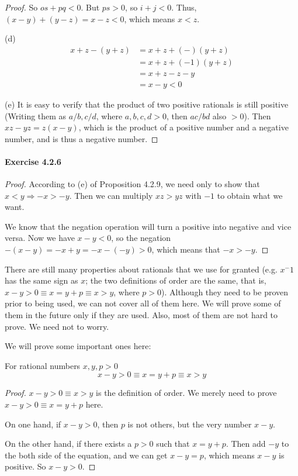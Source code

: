 \begin{proof}
So $os+pq<0$. But $ps>0$, so $i+j<0$. Thus, $(x-y) + (y-z) = x-z<0$, which means $x<z$.

(d)
\begin{align*}
x+z-(y+z) 
&= x+z + (-)(y+z) \\
&= x+z + (-1)(y+z) \\
&= x+z -z - y \\
&= x-y <0
\end{align*}

(e)
It is easy to verify that the product of two positive rationals is still positive (Writing them as 
$a/b,c/d$, where $a,b,c,d>0$, then $ac/bd$ also $>0$). Then $xz-yz=z(x-y)$, which is the product of a 
positive number and a negative number, and is thus a negative number.
\end{proof}

\paragraph{Exercise 4.2.6} \label{exercise4.2.6}
\begin{proof}
According to (e) of Proposition 4.2.9, we need only to show that $x<y \Longrightarrow -x>-y$. Then we can 
multiply $xz>yz$ with $-1$ to obtain what we want.

We know that the negation operation will turn a positive into negative and vice versa. Now we have 
$x-y<0$, so the negation $-(x-y) = -x+y = -x - (-y)>0$, which means that $-x>-y$.
\end{proof}

There are still many properties about rationals that we use for granted (e.g. $x^-1$ has the same sign as 
$x$; the two definitions of order are the same, that is, $x-y>0 \equiv x=y+p \equiv x>y$, where $p>0$). 
Although they need to be proven prior to being used, we can not cover all of them here. We will 
prove some of them in the future only if they are used. Also, most of them are not hard to prove. We need 
not to worry.

We will prove some important ones here:
\begin{prop} \label{prop.different.def.of.order}
For rational numbers $x,y,p>0$
\[
x-y>0 \equiv x=y+p \equiv x>y
\]
\end{prop}
\begin{proof}
$x-y>0 \equiv x>y$ is the definition of order. We merely need to prove $x-y>0 \equiv x=y+p$ here.

On one hand, if $x-y>0$, then $p$ is not others, but the very number $x-y$.

On the other hand, if there exists a $p>0$ such that $x=y+p$. Then add $-y$ to the both side of the 
equation, and we can get $x-y = p$, which means $x-y$ is positive. So $x-y>0$.
\end{proof}

